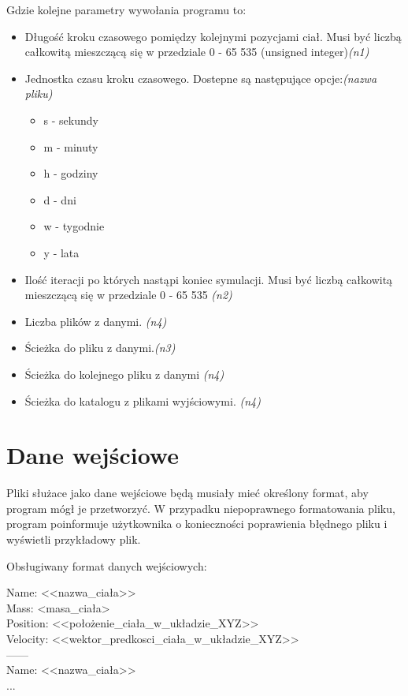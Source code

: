 \documentclass[a4paper,11pt,notitlepage]{article}
\begin{document}
Gdzie kolejne parametry wywołania programu to:
\begin{itemize}[noitemsep]
	\item Długość kroku czasowego pomiędzy kolejnymi pozycjami ciał. Musi być liczbą całkowitą mieszczącą się w przedziale 0 - 65 535 (unsigned integer)\emph{(n1)}
 	\item Jednostka czasu kroku czasowego. Dostepne są następujące opcje:\emph{(nazwa pliku)}
	\begin{itemize}[noitemsep]
		\item s - sekundy
		\item m - minuty
		\item h - godziny
		\item d - dni
		\item w - tygodnie
		\item y - lata
	\end{itemize}
	\item Ilość iteracji po których nastąpi koniec symulacji. Musi być liczbą całkowitą mieszczącą się w przedziale 0 - 65 535 \emph{(n2)}
	\item Liczba plików z danymi. \emph{(n4)}
	\item Ścieżka do pliku z danymi.\emph{(n3)}
	\item Ścieżka do kolejnego pliku z danymi \emph{(n4)}
	\item Ścieżka do katalogu z plikami wyjściowymi. \emph{(n4)}
\end{itemize}

\section{Dane wejściowe}
Pliki służace jako dane wejściowe będą musiały mieć określony format, aby program mógł je przetworzyć. W przypadku niepoprawnego formatowania pliku, program poinformuje użytkownika o konieczności poprawienia błędnego pliku i wyświetli przykładowy plik.

\vspace{0.1in}
Obsługiwany format danych wejściowych:

\vspace{0.1in}

Name: <<nazwa_ciała>>\\
Mass: <masa_ciała>\\
Position: <<położenie_ciała_w_układzie_XYZ>>\\
Velocity: <<wektor_predkosci_ciała_w_układzie_XYZ>>\\
------\\
Name: <<nazwa_ciała>>\\
...\\
\end{document}
